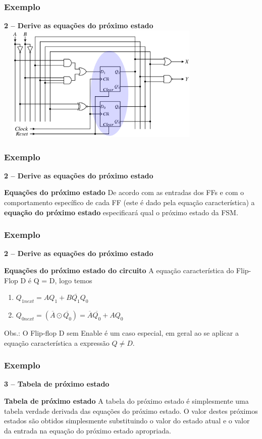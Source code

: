 \documentclass{beamer}
\begin{document}
\begin{frame}
  \frametitle{Exemplo}
  \textbf{2 – Derive as equações do próximo estado}
   \includegraphics[height = 2.2in, width = 4in]{EXEMPLO_ANALISE_3.png}
\end{frame}

\begin{frame}
  \frametitle{Exemplo}
  \textbf{2 – Derive as equações do próximo estado}
  \begin{block}{\textbf{Equações do próximo estado}}
    De acordo com as entradas dos FFs e com o comportamento específico de cada FF (este é dado pela equação característica) a \textbf{equação do próximo estado} 
    especificará qual o próximo estado da FSM.
  \end{block}
\end{frame}

\begin{frame}
  \frametitle{Exemplo}
  \textbf{2 – Derive as equações do próximo estado}
  \begin{block}{\textbf{Equações do próximo estado do circuito}}
    A equação característica do Flip-Flop D é Q = D, logo temos
    \begin{enumerate}
     \item $ Q_{1next} = AQ_1 + B\overline{Q_1}Q_0 $
     \item $ Q_{0next} = (\overline{A}\odot\overline{Q_0}) = \overline{A}\overline{Q_0} + AQ_0 $
    \end{enumerate}
  \end{block}\pause
  Obs.: O Flip-flop D sem Enable é um caso especial, em geral ao se aplicar a equação característica a expressão $ Q \neq D $.
\end{frame}

\begin{frame}
  \frametitle{Exemplo}
  \textbf{3 – Tabela de próximo estado}
  \begin{block}{\textbf{Tabela de próximo estado}}
    A tabela do próximo estado é simplesmente uma tabela verdade derivada das equações do próximo estado. O valor destes próximos estados são obtidos simplesmente 
    substituindo o valor do estado atual e o valor da entrada na equação do próximo estado apropriada. 
  \end{block}
\end{frame}
\end{document}
